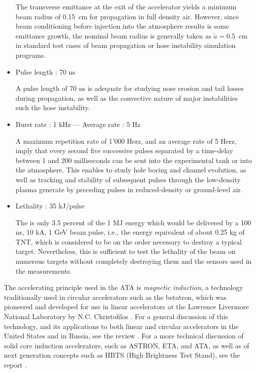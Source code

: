\documentclass [12pt,a4paper,     ]{report} %
\begin{document}
\begin{itemize}
The transverse emittance at the exit of the accelerator yields a minimum beam radius of 0.15~cm for propagation in full density air.  However, since beam conditioning before injection into the atmosphere results is some emittance growth, the nominal beam radius is generally taken as $\tilde{a}=0.5$~cm in  standard test cases of beam propagation \cite{CHAMB1981-} or hose instability \cite{LAMPE1984-} simulation programs.

\item Pulse length : 70 ns

A pulse length of 70 ns is adequate for studying nose erosion and tail losses during propagation, as well as the convective nature of major instabilities such the hose instability.

\item Burst rate : 1 kHz --- Average rate : 5 Hz

A maximum repetition rate of 1'000 Herz, and an average rate of 5 Herz, imply that every second five successive pulses separated by a time-delay between 1 and 200 milliseconds can be sent into the experimental tank or into the atmosphere. This enables to study hole boring and channel evolution, as well as tracking and stability of subsequent pulses through the low-density plasma generate by preceding pulses in reduced-density or ground-level air.

\item Lethality : 35 kJ/pulse

The is only 3.5 percent of the 1 MJ energy which would be delivered by a 100 ns, 10 kA, 1 GeV beam pulse, i.e., the energy equivalent of about 0.25 kg of TNT, which is considered to be on the order necessary to destroy a typical target.  Nevertheless, this is sufficient to test the lethality of the beam on numerous targets without completely destroying them and the sensors used in the measurements.

\end{itemize}


The accelerating principle used in the ATA is \emph{magnetic induction}, a technology traditionally used in circular accelerators such as the betatron, which was pioneered and developed for use in linear accelerators at the Lawrence Livermore National Laboratory by N.C. Christofilos \cite{CHRIS1964-}. For a general discussion of this technology, and its applications to both linear and circular accelerators in the United States and in Russia, see the review \cite{KAPET1985-}. For a more technical discussion of solid core induction accelerators, such as ASTRON, ETA, and ATA, as well as of next generation concepts such as HBTS (High Brightness Test Stand), see the report \cite{SWING1985-}.
\end{document}
